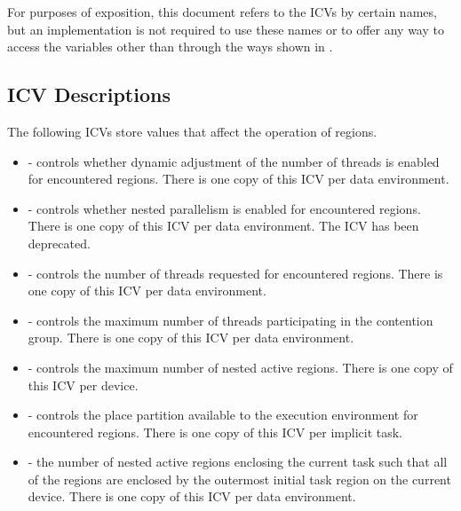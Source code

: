 For purposes of exposition, this document refers to the ICVs by certain names, but an
implementation is not required to use these names or to offer any way to access the
variables other than through the ways shown in
.








\subsection{ICV Descriptions}
\label{subsec:ICV Descriptions}
The following ICVs store values that affect the operation of  regions.

\begin{itemize}
\item {} - controls whether dynamic adjustment of the number of threads is enabled
for encountered  regions. There is one copy of this ICV per data
environment.

\item {} - controls whether nested parallelism is enabled for encountered 
regions. There is one copy of this ICV per data environment. The  ICV has been deprecated.

\item {} - controls the number of threads requested for encountered 
regions. There is one copy of this ICV per data environment.

\item {} - controls the maximum number of threads participating in the
contention group. There is one copy of this ICV per data environment.

\item {} - controls the maximum number of nested active 
regions. There is one copy of this ICV per device.

\item {} - controls the place partition available to the execution
environment for encountered  regions. There is one copy of this ICV per
implicit task.

\item {} - the number of nested active  regions enclosing the current
task such that all of the  regions are enclosed by the outermost initial task
region on the current device. There is one copy of this ICV per data environment.


\end{itemize}
